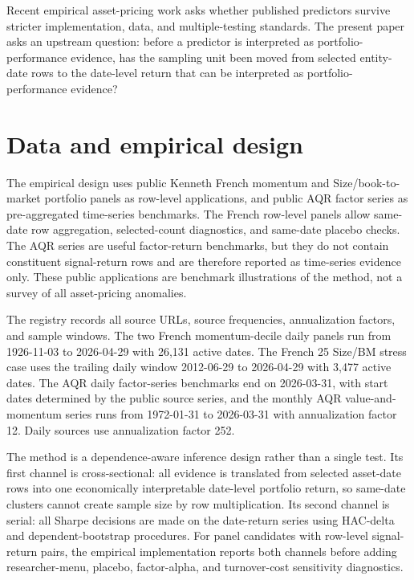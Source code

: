 \documentclass[12pt,a4paper]{article}
\begin{document}
Recent empirical asset-pricing work asks whether
published predictors survive stricter implementation, data, and
multiple-testing standards.  The present paper asks an upstream
question: before a predictor is interpreted as portfolio-performance
evidence, has the sampling unit been moved from selected entity-date
rows to the date-level return that can be interpreted as
portfolio-performance evidence?

\section{Data and empirical design}
\label{sec:method}

The empirical design uses public Kenneth French momentum and
Size/book-to-market portfolio panels as row-level applications, and
public AQR factor series as pre-aggregated time-series benchmarks.  The
French row-level panels allow same-date row aggregation, selected-count
diagnostics, and same-date placebo checks.  The AQR series are useful
factor-return benchmarks, but they do not contain constituent
signal-return rows and are therefore reported as time-series evidence
only.  These public applications are benchmark illustrations of the
method, not a survey of all asset-pricing anomalies.

The registry records all source URLs, source frequencies, annualization
factors, and sample windows.  The two French momentum-decile daily
panels run from 1926-11-03 to 2026-04-29 with 26,131 active dates.  The
French 25 Size/BM stress case uses the trailing daily window
2012-06-29 to 2026-04-29 with 3,477 active dates.  The AQR daily
factor-series benchmarks end on 2026-03-31, with start dates determined
by the public source series, and the monthly AQR value-and-momentum
series runs from 1972-01-31 to 2026-03-31 with annualization factor 12.
Daily sources use annualization factor 252.

The method is a dependence-aware inference design rather than a single
test.  Its first channel is cross-sectional: all evidence is translated
from selected asset-date rows into one economically interpretable
date-level portfolio return, so same-date clusters cannot create sample
size by row multiplication.  Its second channel is serial: all Sharpe
decisions are made on the date-return series using HAC-delta and
dependent-bootstrap procedures.  For panel candidates with row-level
signal-return pairs, the empirical implementation reports both channels
before adding researcher-menu, placebo, factor-alpha, and turnover-cost
sensitivity diagnostics.
\end{document}
